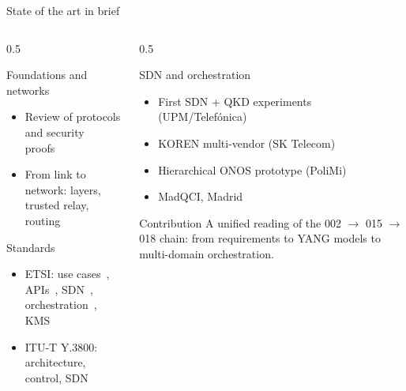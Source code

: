 \documentclass[10pt]{beamer}
\begin{document}
\begin{frame}{State of the art in brief}
  \small
  \begin{columns}[T]
    \begin{column}{0.5\textwidth}
      \begin{block}{Foundations and networks}
        \begin{itemize}
          \item Review of protocols and security proofs~\cite{pirandola2020}
          \item From link to network: layers, trusted relay,
                routing~\cite{mehic2020,cao2022,routing2024}
        \end{itemize}
      \end{block}
      \begin{block}{Standards}
        \begin{itemize}
          \item ETSI: use cases~\cite{qkd002}, APIs~\cite{qkd004,qkd014},
                SDN~\cite{qkd015}, orchestration~\cite{qkd018}, KMS~\cite{qkd020}
          \item ITU-T Y.3800: architecture, control, SDN~\cite{ituy3800,ituy3804,ituy3805}
        \end{itemize}
      \end{block}
    \end{column}
    \begin{column}{0.5\textwidth}
      \begin{block}{SDN and orchestration}
        \begin{itemize}
          \item First SDN + QKD experiments (UPM/Telefónica)~\cite{aguado2016,aguado2020}
          \item KOREN multi-vendor (SK Telecom)~\cite{sim2023}
          \item Hierarchical ONOS prototype (PoliMi)~\cite{vicario2025}
          \item MadQCI, Madrid~\cite{madqci2024}
        \end{itemize}
      \end{block}
      \begin{exampleblock}{Contribution}
        A unified reading of the 002 $\to$ 015 $\to$ 018 chain: from
        requirements to YANG models to multi-domain orchestration.
      \end{exampleblock}
    \end{column}
  \end{columns}
\end{frame}
\end{document}
